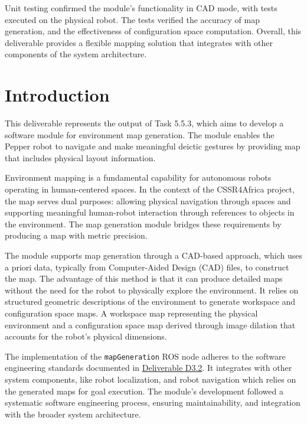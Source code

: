 \documentclass{CSSRforAfrica}
\begin{document}
\noindent Unit testing confirmed the module's functionality in CAD mode, with tests executed on the physical robot. The tests verified the accuracy of map generation, and the effectiveness of configuration space computation. Overall, this deliverable provides a flexible mapping solution that integrates with other components of the system architecture.



\newpage
\pagebreak
\tableofcontents
\newpage

\section{Introduction}
This deliverable represents the output of Task 5.5.3, which aims to develop a software module for environment map generation. The module enables the Pepper robot to navigate and make meaningful deictic gestures by providing map that includes physical layout information.

\noindent Environment mapping is a fundamental capability for autonomous robots operating in human-centered spaces. In the context of the CSSR4Africa project, the map serves dual purposes: allowing physical navigation through spaces and supporting meaningful human-robot interaction through references to objects in the environment. The map generation module bridges these requirements by producing a map with metric precision.

\noindent The module supports map generation through a CAD-based approach, which uses a priori data, typically from Computer-Aided Design (CAD) files, to construct the map. The advantage of this method is that it can produce detailed maps without the need for the robot to physically explore the environment. It relies on structured geometric descriptions of the environment to generate workspace and configuration space maps. A workspace map representing the physical environment and a configuration space map derived through image dilation that accounts for the robot's physical dimensions.

\noindent The implementation of the \texttt{mapGeneration} ROS node adheres to the software engineering standards documented in \href{https://cssr4africa.github.io/deliverables/CSSR4Africa_Deliverable_D3.2.pdf}{Deliverable D3.2}. It integrates with other system components, like robot localization, and robot navigation which relies on the generated maps for goal execution. The module's development followed a systematic software engineering process, ensuring maintainability, and integration with the broader system architecture.
\end{document}
